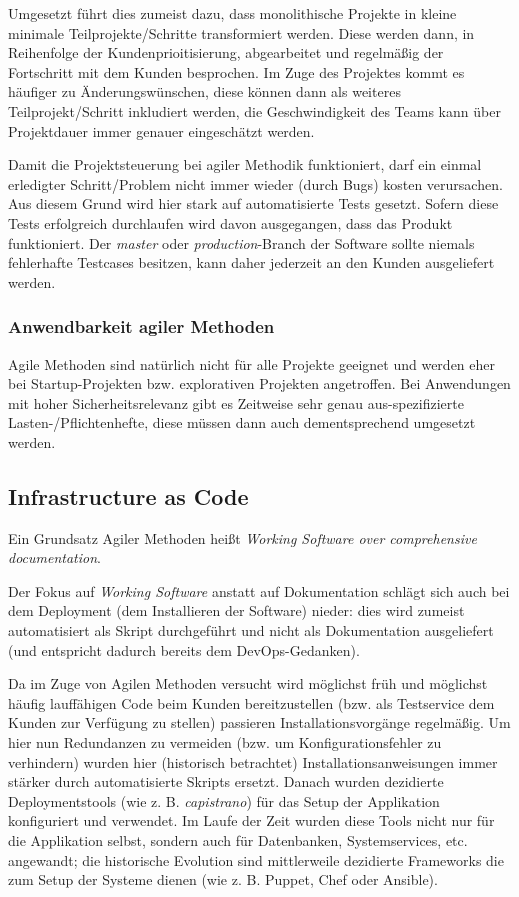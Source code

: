 Umgesetzt führt dies zumeist dazu, dass monolithische Projekte in kleine minimale Teilprojekte/Schritte transformiert werden. Diese werden dann, in Reihenfolge der Kundenprioitisierung, abgearbeitet und regelmäßig der Fortschritt mit dem Kunden besprochen. Im Zuge des Projektes kommt es häufiger zu Änderungswünschen, diese können dann als weiteres Teilprojekt/Schritt inkludiert werden, die Geschwindigkeit des Teams kann über Projektdauer immer genauer eingeschätzt werden.

Damit die Projektsteuerung bei agiler Methodik funktioniert, darf ein einmal erledigter Schritt/Problem nicht immer wieder (durch Bugs) kosten verursachen. Aus diesem Grund wird hier stark auf automatisierte Tests gesetzt. Sofern diese Tests erfolgreich durchlaufen wird davon ausgegangen, dass das Produkt funktioniert. Der \textit{master} oder \textit{production}-Branch der Software sollte niemals fehlerhafte Testcases besitzen, kann daher jederzeit an den Kunden ausgeliefert werden.

\subsubsection{Anwendbarkeit agiler Methoden}

Agile Methoden sind natürlich nicht für alle Projekte geeignet und werden eher bei Startup-Projekten bzw. explorativen Projekten angetroffen. Bei Anwendungen mit hoher Sicherheitsrelevanz gibt es Zeitweise sehr genau aus-spezifizierte Lasten-/Pflichtenhefte, diese müssen dann auch dementsprechend umgesetzt werden.

\subsection{Infrastructure as Code}

Ein Grundsatz Agiler Methoden heißt \textit{Working Software over comprehensive documentation}.

Der Fokus auf \textit{Working Software} anstatt auf Dokumentation schlägt sich auch bei dem Deployment (dem Installieren der Software) nieder: dies wird zumeist automatisiert als Skript durchgeführt und nicht als Dokumentation ausgeliefert (und entspricht dadurch bereits dem DevOps-Gedanken).

Da im Zuge von Agilen Methoden versucht wird möglichst früh und möglichst häufig lauffähigen Code beim Kunden bereitzustellen (bzw. als Testservice dem Kunden zur Verfügung zu stellen) passieren Installationsvorgänge regelmäßig. Um hier nun Redundanzen zu vermeiden (bzw. um Konfigurationsfehler zu verhindern) wurden hier (historisch betrachtet) Installationsanweisungen immer stärker durch automatisierte Skripts ersetzt. Danach wurden dezidierte Deploymentstools (wie z. B. \textit{capistrano}) für das Setup der Applikation konfiguriert und verwendet. Im Laufe der Zeit wurden diese Tools nicht nur für die Applikation selbst, sondern auch für Datenbanken, Systemservices, etc. angewandt; die historische Evolution sind mittlerweile dezidierte Frameworks die zum Setup der Systeme dienen (wie z. B. Puppet, Chef oder Ansible).

